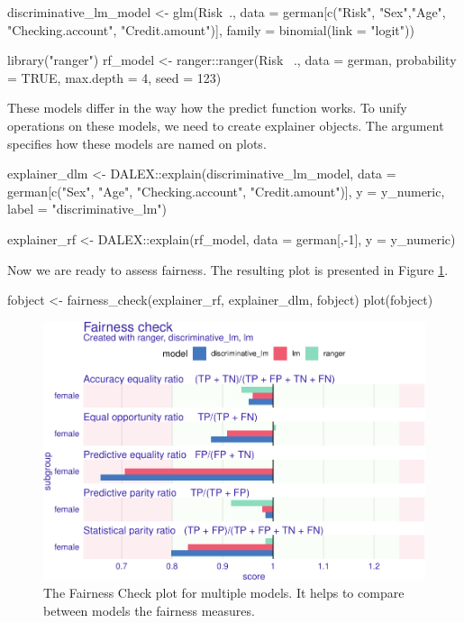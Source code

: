 \begin{example}
discriminative_lm_model <- glm(Risk~.,
         data   = german[c("Risk", "Sex","Age",
                "Checking.account", "Credit.amount")],
         family = binomial(link = "logit"))

library("ranger")
rf_model <- ranger::ranger(Risk ~.,
         data = german, probability = TRUE,
         max.depth = 4, seed = 123)
\end{example}

These models differ in the way how the predict function works. To unify
operations on these models, we need to create  explainer
objects. The  argument specifies how these models are
named on plots.

\begin{example}
explainer_dlm <- DALEX::explain(discriminative_lm_model,
        data = german[c("Sex", "Age", "Checking.account", "Credit.amount")],
        y = y_numeric,
        label = "discriminative_lm") 

explainer_rf <- DALEX::explain(rf_model, 
        data = german[,-1], y = y_numeric)
\end{example}

Now we are ready to assess fairness. The resulting plot is presented in
Figure \ref{fig:fairness-plot-3}.

\begin{example}
fobject <- fairness_check(explainer_rf, explainer_dlm, fobject)
plot(fobject)
\end{example}

\begin{figure}
{\centering \includegraphics[width=0.75\linewidth]{Wisniewski-Biecek_files/figure-latex/fairness-plot-3-1} 

}

\caption[The Fairness Check plot for multiple models]{The Fairness Check plot for multiple models. It helps to compare between models the fairness measures.}\label{fig:fairness-plot-3}
\end{figure}



